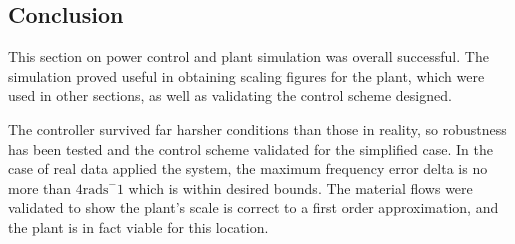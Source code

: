 \subsection{Conclusion}

This section on power control and plant simulation was overall successful.
The simulation proved useful in obtaining scaling figures for the plant, which were used in other sections, as well as validating the control scheme designed.

The controller survived far harsher conditions than those in reality, so robustness has been tested and the control scheme validated for the simplified case.
In the case of real data applied the system, the maximum frequency error delta is no more than $4 \text{rads}^-1$ which is within desired bounds.
The material flows were validated to show the plant's scale is correct to a first order approximation, and the plant is in fact viable for this location.